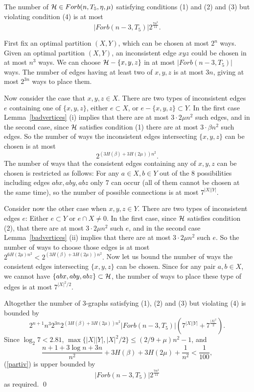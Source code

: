 \documentclass[11pt]{article}
\begin{document}
\begin{lemma} \label{4}
The number of  $\mathcal{H} \in Forb(n,T_5,\eta,\mu)$ satisfying conditions (1) and (2) and (3) but violating condition (4)
is at most
$$|Forb(n-3,T_5)|
2^{\frac{7n^2}{11}}.$$
\end{lemma}
\proof  First fix an optimal partition $(X,Y)$,
which can be chosen at most $2^n$ ways.
 Given an optimal partition $(X,Y)$,  an inconsistent edge $xyz$ could be chosen in
 at most $n^3$ ways. We can choose $\mathcal{H}-\{x,y,z\}$ in
at most $|Forb(n-3,T_5)|$ ways. The number of  edges having at least
 two of $x,y,z$ is at most $3n$, giving at most $2^{3n}$ ways to place
them.

Now consider the case that $x,y,z\in X$.
  There are two
types of inconsistent edges $e$ containing one of $\{x,y,z\}$, either $e \subset X$, or $e-\{x,y,z\} \subset Y$.
In the first case Lemma~\ref{badvertices} (i) implies that there are at most
$3\cdot 2\mu n^2$ such edges, and in the second case,  since $\mathcal{H}$ satisfies condition (1)  there are at most $3\cdot \beta n^2$ such edges.
So the number
of ways the  inconsistent edges  intersecting $\{x,y,z\}$ can be
chosen is at most
$$2^{(3H(\beta)+3H(2\mu)) n^2}.$$
The number of ways that the consistent edges containing any of
$x,y,z$  can  be chosen is restricted as follows:
   For any $a\in X, b\in Y$ out
of the $8$ possibilities including edges $abx,aby,abz$ only $7$ can
occur (all of them cannot be chosen at the same time), so the number
of possible connections is at most $7^{|X||Y|}$.

Consider now  the other case when $x,y,z\in Y$.  There are two types
of inconsistent edges $e$: Either $e\subset Y$ or $e\cap X\ne 0$. In
the first case, since $\mathcal{H}$ satisfies  condition (2), that there are at most $3\cdot
2\mu n^2$ such $e$, and in the second case
  Lemma~\ref{badvertices} (ii) implies that there are at most $3\cdot 2\mu n^2$
  such $e$.
 So the number of ways to choose those edges is at most $2^{6H(2\mu)
n^2}<2^{(3H(\beta)+3H(2\mu)) n^2}.$ Now let us bound the number of
ways the consistent edges intersecting $\{x,y,z\}$ can be chosen.
Since
 for any pair  $a,b\in X$, we cannot have $\{abx,aby,abz\}\subset \mathcal{H}$,
 the number of ways to place these type of edges is at most $7^{|X|^2/2}$.

Altogether the number of 3-graphs satisfying (1), (2) and (3) but violating (4) is bounded by
\begin{equation}\label{partiv}2^{n+1}n^3 2^{3n} 2^{{(3H(\beta)+3H(2\mu)) n^2}}|Forb(n-3,T_5)|
\left(7^{|X||Y|}+ 7^{\frac{|X|^2}{2}}\right).
\end{equation}
Since $\log_2 7< 2.81$, $\max\{|X||Y| ,|X|^2/2\}\le
(2/9+\mu)n^2 -1$, and
$$
\frac{n+1+3\log n+ 3n}{n^2} + 3H(\beta) +3H(2\mu)
+\frac{1}{n^2}<\frac{1}{100},
$$
(\ref{partiv}) is upper bounded by
$$|Forb(n-3,T_5)|
2^{\frac{7n^2}{11}}$$
as required. \qed
\end{document}
